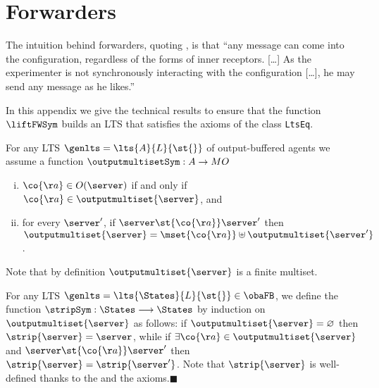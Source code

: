 \newpage
\section{Forwarders}
\label{sec:appendix-forxarders}

The intuition behind forwarders, quoting \cite{DBLP:conf/ecoop/HondaT91},
is that ``any message can come into the configuration, regardless of the forms of
inner receptors. [\ldots] As the experimenter is not synchronously
interacting with the configuration [\ldots], he may send any message
as he likes.''

In this appendix we give the technical results to ensure that
the function $\liftFWSym$ builds an LTS that satisfies
the axioms of the class \texttt{LtsEq}.


For any LTS $\genlts =\lts{ A }{L}{\st{}}$ of output-buffered agents we assume a function $\outputmultisetSym : A \rightarrow MO$
\begin{enumerate}[(i)]
\item
  $\co{\aa} \in O(\server)$ if and only if $\co{\aa} \in \outputmultiset{\server}$, and
\item
  for every $\server'$, if $\server \st{\co{\aa}} \server'$ then $\outputmultiset{\server} = \mset{\co{\aa}} \uplus \outputmultiset{\server'}$.
\end{enumerate}
Note that by definition $\outputmultiset{ \server }$ is a finite multiset.


\begin{definition}\label{def:strip-def}
  For any LTS $\genlts = \lts{\States}{L}{\st{}} \in \obaFB$,
  we define the function $\stripSym : \States \longrightarrow \States$ by induction on $
  \outputmultiset{ \server }$ as follows: if
  $\outputmultiset{\server}  = \varnothing $ then
  $\strip{\server} = \server$, while
  if $\exists \co{\aa} \in \outputmultiset{\server}$ and $\server \st{ \co{\aa} } \server'$ then
  $ \strip{ \server } =  \strip{ \server' } $.
  Note that $\strip{ \server }$ is well-defined thanks to the \outputdeterminacy
  and the \outputcommutativity axioms.\hfill$\blacksquare$
\end{definition}




